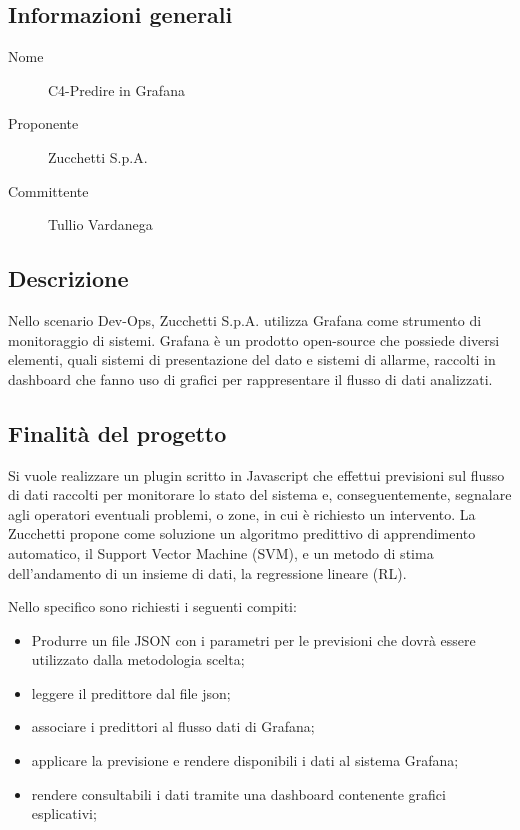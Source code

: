\documentclass[../studio-di-fattibilita.tex]{subfiles}
\begin{document}
  \subsection{Informazioni generali}%
  \label{subsec:informazioni_generali}
  \begin{description}
    \item[Nome] C4-Predire in Grafana
    \item[Proponente] Zucchetti S.p.A.
    \item[Committente] Tullio Vardanega
  \end{description}


  \subsection{Descrizione}%
  \label{subsec:descrizione}
  Nello scenario Dev-Ops, Zucchetti S.p.A. utilizza Grafana come strumento di monitoraggio di sistemi.
  Grafana è un prodotto open-source che possiede diversi elementi, quali sistemi di presentazione del dato e sistemi di allarme, raccolti in dashboard che fanno uso di grafici per rappresentare il flusso di dati analizzati.


  \subsection{Finalità del progetto}%
  \label{subsec:finalita_del_progetto}
  Si vuole realizzare un plugin scritto in Javascript che effettui previsioni sul flusso di dati raccolti per monitorare lo stato del sistema e, conseguentemente, segnalare agli operatori eventuali problemi, o zone, in cui è richiesto un intervento. La Zucchetti propone come soluzione un algoritmo predittivo di apprendimento automatico, il Support Vector Machine (SVM), e un metodo di stima dell'andamento di un insieme di dati, la regressione lineare (RL).

  Nello specifico sono richiesti i seguenti compiti:
  \begin{itemize}
    \item Produrre un file JSON con i parametri per le previsioni che dovrà essere utilizzato dalla metodologia scelta;
    \item leggere il predittore dal file json;
    \item associare i predittori al flusso dati di Grafana;
    \item applicare la previsione e rendere disponibili i dati al sistema Grafana;
    \item rendere consultabili i dati tramite una dashboard contenente grafici esplicativi;
  \end{itemize}
\end{document}
